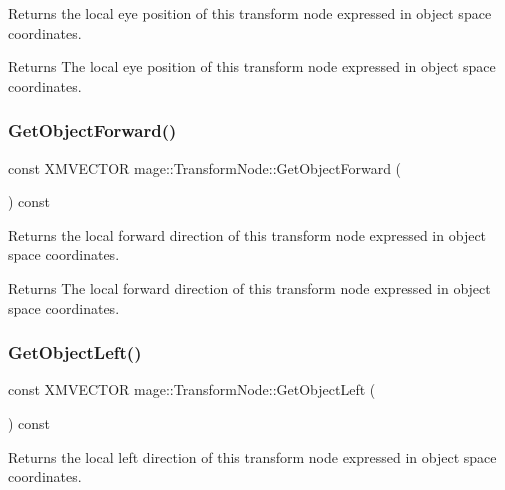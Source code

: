Returns the local eye position of this transform node expressed in object space coordinates.

\begin{DoxyReturn}{Returns}
The local eye position of this transform node expressed in object space coordinates. 
\end{DoxyReturn}
\hypertarget{structmage_1_1_transform_node_a4340e1f87d15589e3d763c0f124037bd}{}\label{structmage_1_1_transform_node_a4340e1f87d15589e3d763c0f124037bd} 
\subsubsection{\texorpdfstring{Get\+Object\+Forward()}{GetObjectForward()}}
{\footnotesize\ttfamily const X\+M\+V\+E\+C\+T\+OR mage\+::\+Transform\+Node\+::\+Get\+Object\+Forward (\begin{DoxyParamCaption}{ }\end{DoxyParamCaption}) const\hspace{0.3cm}{\ttfamily [noexcept]}}

Returns the local forward direction of this transform node expressed in object space coordinates.

\begin{DoxyReturn}{Returns}
The local forward direction of this transform node expressed in object space coordinates. 
\end{DoxyReturn}
\hypertarget{structmage_1_1_transform_node_a674580a5f7f8926e5b1e9ce7ac312cb2}{}\label{structmage_1_1_transform_node_a674580a5f7f8926e5b1e9ce7ac312cb2} 
\subsubsection{\texorpdfstring{Get\+Object\+Left()}{GetObjectLeft()}}
{\footnotesize\ttfamily const X\+M\+V\+E\+C\+T\+OR mage\+::\+Transform\+Node\+::\+Get\+Object\+Left (\begin{DoxyParamCaption}{ }\end{DoxyParamCaption}) const\hspace{0.3cm}{\ttfamily [noexcept]}}

Returns the local left direction of this transform node expressed in object space coordinates.

